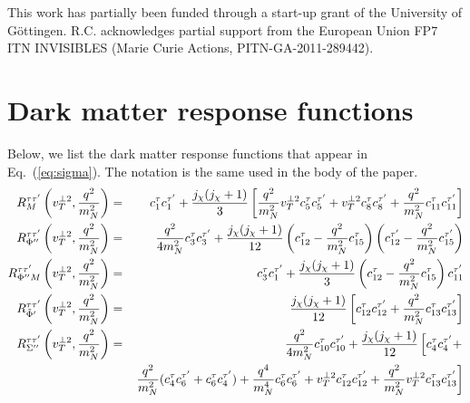 \documentclass[11pt,a4paper]{article}
\begin{document}
\appendix

\acknowledgments This work has partially been funded through a start-up grant of the University of G\"ottingen. R.C. acknowledges partial support from the European Union FP7 ITN INVISIBLES (Marie Curie Actions, PITN-GA-2011-289442).

\section{Dark matter response functions}
\label{sec:appDM}
Below, we list the dark matter response functions that appear in Eq.~(\ref{eq:sigma}). The notation is the same used in the body of the paper.
\begin{eqnarray}
 R_{M}^{\tau \tau^\prime}\left(v_T^{\perp 2}, {q^2 \over m_N^2}\right) &=& c_1^\tau c_1^{\tau^\prime } + {j_\chi (j_\chi+1) \over 3} \left[ {q^2 \over m_N^2} v_T^{\perp 2} c_5^\tau c_5^{\tau^\prime }+v_T^{\perp 2}c_8^\tau c_8^{\tau^\prime }
+ {q^2 \over m_N^2} c_{11}^\tau c_{11}^{\tau^\prime } \right] \nonumber \\
 R_{\Phi^{\prime \prime}}^{\tau \tau^\prime}\left(v_T^{\perp 2}, {q^2 \over m_N^2}\right) &=& {q^2 \over 4 m_N^2} c_3^\tau c_3^{\tau^\prime } + {j_\chi (j_\chi+1) \over 12} \left( c_{12}^\tau-{q^2 \over m_N^2} c_{15}^\tau\right) \left( c_{12}^{\tau^\prime }-{q^2 \over m_N^2}c_{15}^{\tau^\prime} \right)  \nonumber \\
 R_{\Phi^{\prime \prime} M}^{\tau \tau^\prime}\left(v_T^{\perp 2}, {q^2 \over m_N^2}\right) &=&  c_3^\tau c_1^{\tau^\prime } + {j_\chi (j_\chi+1) \over 3} \left( c_{12}^\tau -{q^2 \over m_N^2} c_{15}^\tau \right) c_{11}^{\tau^\prime } \nonumber \\
  R_{\tilde{\Phi}^\prime}^{\tau \tau^\prime}\left(v_T^{\perp 2}, {q^2 \over m_N^2}\right) &=&{j_\chi (j_\chi+1) \over 12} \left[ c_{12}^\tau c_{12}^{\tau^\prime }+{q^2 \over m_N^2}  c_{13}^\tau c_{13}^{\tau^\prime}  \right] \nonumber \\
   R_{\Sigma^{\prime \prime}}^{\tau \tau^\prime}\left(v_T^{\perp 2}, {q^2 \over m_N^2}\right)  &=&{q^2 \over 4 m_N^2} c_{10}^\tau  c_{10}^{\tau^\prime } +
  {j_\chi (j_\chi+1) \over 12} \left[ c_4^\tau c_4^{\tau^\prime} + \right.  \nonumber \\
 && \left. {q^2 \over m_N^2} ( c_4^\tau c_6^{\tau^\prime }+c_6^\tau c_4^{\tau^\prime })+
 {q^4 \over m_N^4} c_{6}^\tau c_{6}^{\tau^\prime } +v_T^{\perp 2} c_{12}^\tau c_{12}^{\tau^\prime }+{q^2 \over m_N^2} v_T^{\perp 2} c_{13}^\tau c_{13}^{\tau^\prime } \right] \nonumber \\

\end{eqnarray}
\end{document}

